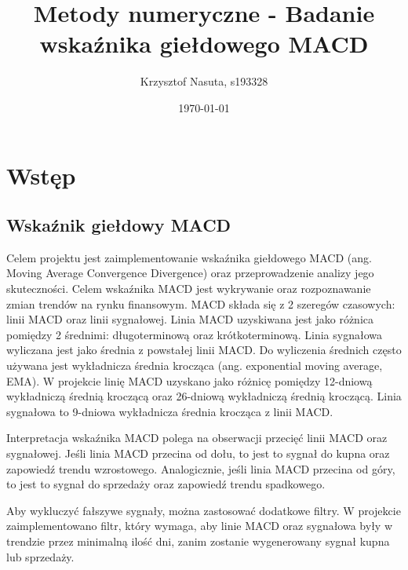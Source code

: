 \documentclass[12pt, a4paper]{article}
\title{Metody numeryczne - Badanie wskaźnika giełdowego MACD}
\author{Krzysztof Nasuta, s193328}
\date{\today}
\begin{document}
\maketitle

\section{Wstęp}

\subsection{Wskaźnik giełdowy MACD}
Celem projektu jest zaimplementowanie wskaźnika giełdowego MACD (ang. Moving Average Convergence Divergence)
oraz przeprowadzenie analizy jego skuteczności. Celem wskaźnika MACD jest wykrywanie oraz rozpoznawanie
zmian trendów na rynku finansowym. MACD składa się z 2 szeregów czasowych: linii MACD oraz linii sygnałowej.
Linia MACD uzyskiwana jest jako różnica pomiędzy 2 średnimi: długoterminową oraz krótkoterminową.
Linia sygnałowa wyliczana jest jako średnia z powstałej linii MACD. Do wyliczenia średnich często
używana jest wykładnicza średnia krocząca (ang. exponential moving average, EMA). W projekcie linię MACD uzyskano jako różnicę
pomiędzy 12-dniową wykładniczą średnią kroczącą oraz 26-dniową wykładniczą średnią kroczącą. Linia sygnałowa to
9-dniowa wykładnicza średnia krocząca z linii MACD.

Interpretacja wskaźnika MACD polega na obserwacji przecięć linii MACD oraz sygnałowej. Jeśli linia MACD przecina od dołu,
to jest to sygnał do kupna oraz zapowiedź trendu wzrostowego. Analogicznie, jeśli linia MACD przecina od góry, to jest to sygnał
do sprzedaży oraz zapowiedź trendu spadkowego.

Aby wykluczyć fałszywe sygnały, można zastosować dodatkowe filtry. W projekcie zaimplementowano filtr, który wymaga, aby linie MACD oraz sygnałowa
były w trendzie przez minimalną ilość dni, zanim zostanie wygenerowany sygnał kupna lub sprzedaży.
\end{document}
